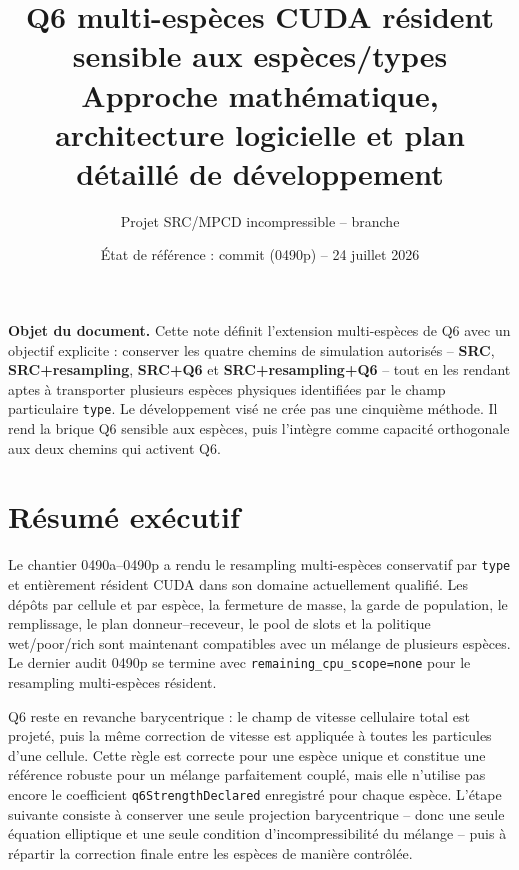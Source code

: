 \documentclass[11pt,a4paper]{article}
\title{\vspace{-1.2cm}\textbf{Q6 multi-espèces CUDA résident sensible aux espèces/types}\\[0.4em]
\large Approche mathématique, architecture logicielle et plan détaillé de développement}
\author{Projet SRC/MPCD incompressible -- branche \code{surf}}
\date{État de référence : commit \code{36abd23} (0490p) -- 24 juillet 2026}
\newcommand{\code}[1]{\texttt{#1}}
\begin{document}
\maketitle

\begin{center}
\colorbox{softblue}{\parbox{0.94\linewidth}{
\textbf{Objet du document.} Cette note définit l'extension multi-espèces de Q6 avec un objectif explicite : conserver les quatre chemins de simulation autorisés -- \textbf{SRC}, \textbf{SRC+resampling}, \textbf{SRC+Q6} et \textbf{SRC+resampling+Q6} -- tout en les rendant aptes à transporter plusieurs espèces physiques identifiées par le champ particulaire \code{type}. Le développement visé ne crée pas une cinquième méthode. Il rend la brique Q6 sensible aux espèces, puis l'intègre comme capacité orthogonale aux deux chemins qui activent Q6.
}}
\end{center}

\tableofcontents
\newpage

\section{Résumé exécutif}

Le chantier 0490a--0490p a rendu le resampling multi-espèces conservatif par \code{type} et entièrement résident CUDA dans son domaine actuellement qualifié. Les dépôts par cellule et par espèce, la fermeture de masse, la garde de population, le remplissage, le plan donneur--receveur, le pool de slots et la politique wet/poor/rich sont maintenant compatibles avec un mélange de plusieurs espèces. Le dernier audit 0490p se termine avec \code{remaining\_cpu\_scope=none} pour le resampling multi-espèces résident.

Q6 reste en revanche barycentrique : le champ de vitesse cellulaire total est projeté, puis la même correction de vitesse est appliquée à toutes les particules d'une cellule. Cette règle est correcte pour une espèce unique et constitue une référence robuste pour un mélange parfaitement couplé, mais elle n'utilise pas encore le coefficient \code{q6StrengthDeclared} enregistré pour chaque espèce. L'étape suivante consiste à conserver une seule projection barycentrique -- donc une seule équation elliptique et une seule condition d'incompressibilité du mélange -- puis à répartir la correction finale entre les espèces de manière contrôlée.
\end{document}
